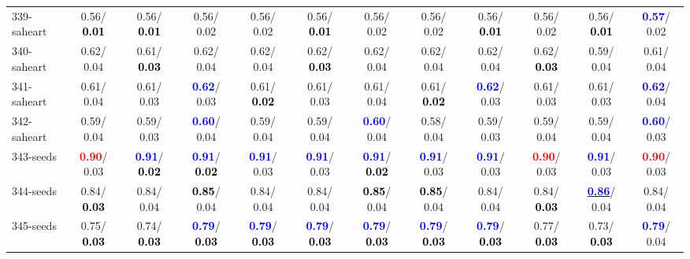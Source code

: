 \begin{table}[h]
\begin{center}
{\begin{tabular}{lc|c|c|c|c|c|c|c|c|c|c}
339-saheart &   0.56/\textcolor{black}{\textbf{  0.01}} &   0.56/\textcolor{black}{\textbf{  0.01}} &   0.56/  0.02 &   0.56/  0.02 &   0.56/\textcolor{black}{\textbf{  0.01}} &   0.56/  0.02 &   0.56/  0.02 &   0.56/\textcolor{black}{\textbf{  0.01}} &   0.56/  0.02 &   0.56/\textcolor{black}{\textbf{  0.01}} & \textcolor{blue}{\textbf{  0.57}}/  0.02 \\
340-saheart &   0.62/  0.04 &   0.61/\textcolor{black}{\textbf{  0.03}} &   0.62/  0.04 &   0.62/  0.04 &   0.62/\textcolor{black}{\textbf{  0.03}} &   0.62/  0.04 &   0.62/  0.04 &   0.62/  0.04 &   0.62/\textcolor{black}{\textbf{  0.03}} &   0.59/  0.04 &   0.61/  0.04 \\
341-saheart &   0.61/  0.04 &   0.61/  0.03 & \textcolor{blue}{\textbf{  0.62}}/  0.03 &   0.61/\textcolor{black}{\textbf{  0.02}} &   0.61/  0.03 &   0.61/  0.04 &   0.61/\textcolor{black}{\textbf{  0.02}} & \textcolor{blue}{\textbf{  0.62}}/  0.03 &   0.61/  0.03 &   0.61/  0.03 & \textcolor{blue}{\textbf{  0.62}}/  0.04 \\ \hline
342-saheart &   0.59/  0.04 &   0.59/  0.03 & \textcolor{blue}{\textbf{  0.60}}/  0.04 &   0.59/  0.04 &   0.59/  0.04 & \textcolor{blue}{\textbf{  0.60}}/  0.04 &   0.58/  0.04 &   0.59/  0.03 &   0.59/  0.04 &   0.59/  0.04 & \textcolor{blue}{\textbf{  0.60}}/  0.03 \\
343-seeds & \textcolor{red}{\textbf{  0.90}}/  0.03 & \textcolor{blue}{\textbf{  0.91}}/\textcolor{black}{\textbf{  0.02}} & \textcolor{blue}{\textbf{  0.91}}/\textcolor{black}{\textbf{  0.02}} & \textcolor{blue}{\textbf{  0.91}}/  0.03 & \textcolor{blue}{\textbf{  0.91}}/  0.03 & \textcolor{blue}{\textbf{  0.91}}/\textcolor{black}{\textbf{  0.02}} & \textcolor{blue}{\textbf{  0.91}}/  0.03 & \textcolor{blue}{\textbf{  0.91}}/  0.03 & \textcolor{red}{\textbf{  0.90}}/  0.03 & \textcolor{blue}{\textbf{  0.91}}/  0.03 & \textcolor{red}{\textbf{  0.90}}/  0.03 \\
344-seeds &   0.84/\textcolor{black}{\textbf{  0.03}} &   0.84/  0.04 & \textcolor{black}{\textbf{  0.85}}/  0.04 &   0.84/  0.04 &   0.84/  0.04 & \textcolor{black}{\textbf{  0.85}}/  0.04 & \textcolor{black}{\textbf{  0.85}}/  0.04 &   0.84/  0.04 &   0.84/\textcolor{black}{\textbf{  0.03}} & \underline{\textcolor{blue}{\textbf{  0.86}}}/  0.04 &   0.84/  0.04 \\
345-seeds &   0.75/\textcolor{black}{\textbf{  0.03}} &   0.74/\textcolor{black}{\textbf{  0.03}} & \textcolor{blue}{\textbf{  0.79}}/\textcolor{black}{\textbf{  0.03}} & \textcolor{blue}{\textbf{  0.79}}/\textcolor{black}{\textbf{  0.03}} & \textcolor{blue}{\textbf{  0.79}}/\textcolor{black}{\textbf{  0.03}} & \textcolor{blue}{\textbf{  0.79}}/\textcolor{black}{\textbf{  0.03}} & \textcolor{blue}{\textbf{  0.79}}/\textcolor{black}{\textbf{  0.03}} & \textcolor{blue}{\textbf{  0.79}}/\textcolor{black}{\textbf{  0.03}} &   0.77/\textcolor{black}{\textbf{  0.03}} &   0.73/\textcolor{black}{\textbf{  0.03}} & \textcolor{blue}{\textbf{  0.79}}/  0.04 \\

\end{tabular}}
\end{center}
\end{table}
